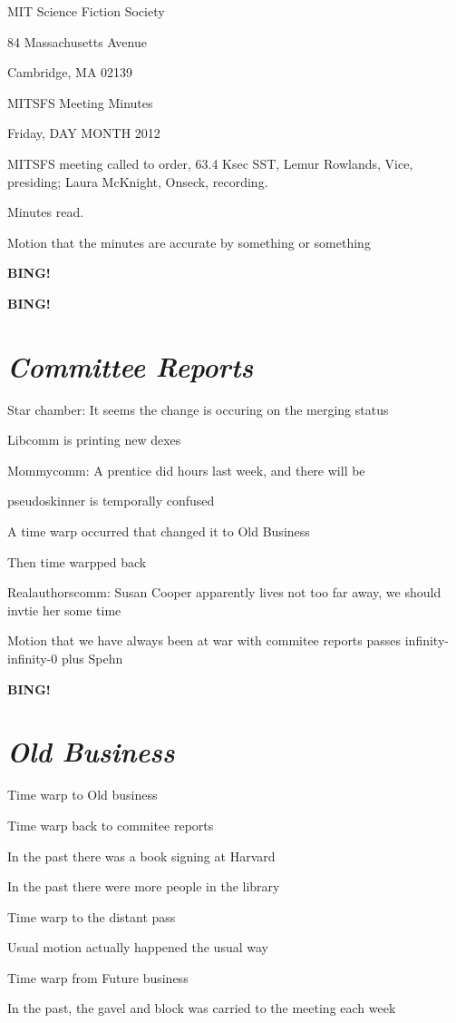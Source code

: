 \documentclass[10pt]{article}
\newcommand{\bing}{{\bf BING!} }
\newcommand{\goto}[1]{\bing \vskip 12pt \section*{{\em{#1}}}}
\newcommand{\ps}{ plus Spehn\xspace}
\newcommand{\skinner}{Lemur Rowlands, Vice}
\newcommand{\onseck}{Laura McKnight, Onseck}
\newcommand{\meetingdate}{Friday, DAY MONTH 2012}
\begin{document}
\begin{center}

MIT Science Fiction Society

84 Massachusetts Avenue

Cambridge, MA 02139

\vspace{12pt}

MITSFS Meeting Minutes

\meetingdate

\end{center}

\vspace{18pt}

\setlength{\parskip}{6pt}

\noindent
MITSFS meeting called to order, 63.4 Ksec SST,
\skinner, presiding; \onseck, recording.

Minutes read.

Motion that the minutes are accurate by something or something

\bing

\goto{Committee Reports}

Star chamber: It seems the change is occuring on the merging status

Libcomm is printing new dexes

Mommycomm: A prentice did hours last week, and there will be 

pseudoskinner is temporally confused

A time warp occurred that changed it to Old Business

Then time warpped back

Realauthorscomm: Susan Cooper apparently lives not too far away, we should invtie her some time

Motion that we have always been at war with commitee reports passes infinity-infinity-0\ps

\goto{Old Business}

Time warp to Old business

Time warp back to commitee reports

In the past there was a book signing at Harvard

In the past there were more people in the library

Time warp to the distant pass

Usual motion actually happened the usual way

Time warp from Future business

In the past, the gavel and block was carried to the meeting each week
\end{document}
